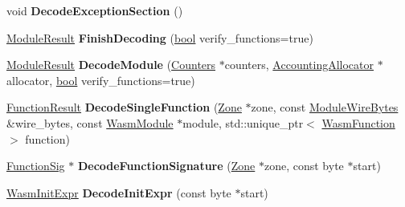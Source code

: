 \begin{DoxyCompactItemize}
void {\bfseries Decode\+Exception\+Section} ()
\item 
\mbox{\label{classv8_1_1internal_1_1wasm_1_1ModuleDecoderImpl_a196a29e3592658fd2a57a70660ab337a}} 
\mbox{\hyperlink{classv8_1_1internal_1_1wasm_1_1Result}{Module\+Result}} {\bfseries Finish\+Decoding} (\mbox{\hyperlink{classbool}{bool}} verify\+\_\+functions=true)
\item 
\mbox{\label{classv8_1_1internal_1_1wasm_1_1ModuleDecoderImpl_a8c9e0cb713a0c476c309a8aa8bae0578}} 
\mbox{\hyperlink{classv8_1_1internal_1_1wasm_1_1Result}{Module\+Result}} {\bfseries Decode\+Module} (\mbox{\hyperlink{classv8_1_1internal_1_1Counters}{Counters}} $\ast$counters, \mbox{\hyperlink{classv8_1_1internal_1_1AccountingAllocator}{Accounting\+Allocator}} $\ast$allocator, \mbox{\hyperlink{classbool}{bool}} verify\+\_\+functions=true)
\item 
\mbox{\label{classv8_1_1internal_1_1wasm_1_1ModuleDecoderImpl_a67dd5613c48a57129228ffb5fe21e1c6}} 
\mbox{\hyperlink{classv8_1_1internal_1_1wasm_1_1Result}{Function\+Result}} {\bfseries Decode\+Single\+Function} (\mbox{\hyperlink{classv8_1_1internal_1_1Zone}{Zone}} $\ast$zone, const \mbox{\hyperlink{structv8_1_1internal_1_1wasm_1_1ModuleWireBytes}{Module\+Wire\+Bytes}} \&wire\+\_\+bytes, const \mbox{\hyperlink{structv8_1_1internal_1_1wasm_1_1WasmModule}{Wasm\+Module}} $\ast$module, std\+::unique\+\_\+ptr$<$ \mbox{\hyperlink{structv8_1_1internal_1_1wasm_1_1WasmFunction}{Wasm\+Function}} $>$ function)
\item 
\mbox{\label{classv8_1_1internal_1_1wasm_1_1ModuleDecoderImpl_a254d14e01a3e3c1db5767d2760e26c4c}} 
\mbox{\hyperlink{classv8_1_1internal_1_1Signature}{Function\+Sig}} $\ast$ {\bfseries Decode\+Function\+Signature} (\mbox{\hyperlink{classv8_1_1internal_1_1Zone}{Zone}} $\ast$zone, const byte $\ast$start)
\item 
\mbox{\label{classv8_1_1internal_1_1wasm_1_1ModuleDecoderImpl_a4b39a0946c73a77303a0732082a00736}} 
\mbox{\hyperlink{structv8_1_1internal_1_1wasm_1_1WasmInitExpr}{Wasm\+Init\+Expr}} {\bfseries Decode\+Init\+Expr} (const byte $\ast$start)

\end{DoxyCompactItemize}
